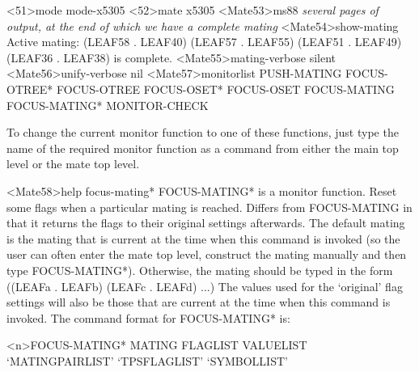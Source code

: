 \begin{tpsexample}
<51>mode mode-x5305
<52>mate x5305
<Mate53>ms88
{\it several pages of output, at the end of which we have a complete mating}
<Mate54>show-mating
Active mating: (LEAF58 . LEAF40)  (LEAF57 . LEAF55)  (LEAF51 . LEAF49)
(LEAF36 . LEAF38) is complete.
<Mate55>mating-verbose silent
<Mate56>unify-verbose nil
<Mate57>monitorlist
PUSH-MATING FOCUS-OTREE* FOCUS-OTREE FOCUS-OSET* FOCUS-OSET FOCUS-MATING
FOCUS-MATING* MONITOR-CHECK

To change the current monitor function to one of these functions,
just type the name of the required monitor function as a command from either
the main top level or the mate top level.

<Mate58>help focus-mating*
FOCUS-MATING* is a monitor function.
Reset some flags when a particular mating is reached. Differs
from FOCUS-MATING in that it returns the flags to their original
settings afterwards. The default mating is the mating that
is current at the time when this command is invoked (so the user
can often enter the mate top level, construct the mating manually and
then type FOCUS-MATING*). Otherwise, the mating should be typed in the form
((LEAFa . LEAFb) (LEAFc . LEAFd) ...)
The values used for the `original' flag settings will also
be those that are current at the time when this command is invoked.
The command format for FOCUS-MATING* is:

<n>FOCUS-MATING*       MATING         FLAGLIST     VALUELIST
                  `MATINGPAIRLIST' `TPSFLAGLIST' `SYMBOLLIST'


\end{tpsexample}
